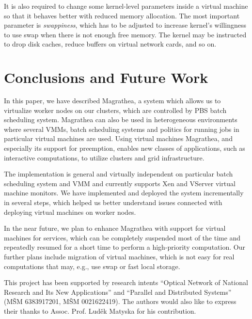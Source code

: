 \documentclass{sigplanconf}
\begin{document}
It is also required to change some kernel-level parameters inside a virtual
machine so that it behaves better with reduced memory allocation. The most
important parameter is \textit{swappiness}, which has to be adjusted to
increase kernel's willingness to use swap when there is not enough free
memory. The kernel may be instructed to drop disk caches, reduce buffers on
virtual network cards, and so on.

\section{Conclusions and Future Work}

In this paper, we have described Magrathea, a system which allows us to
virtualize worker nodes on our clusters, which are controlled by PBS batch
scheduling system. Magrathea can also be used in heterogeneous environments
where several VMMs, batch scheduling systems and politics for running jobs in
particular virtual machines are used. Using virtual machines Magrathea, and
especially its support for preemption, enables new classes of applications,
such as interactive computations, to utilize clusters and grid infrastructure.

The implementation is general and virtually independent on particular batch
scheduling system and VMM and currently supports Xen and VServer virtual
machine monitors. We have implemented and deployed the system incrementally in
several steps, which helped us better understand issues connected with
deploying virtual machines on worker nodes.

In the near future, we plan to enhance Magrathea with support for virtual
machines for services, which can be completely suspended most of the time and
repeatedly resumed for a short time to perform a high-priority computation.
Our further plans include migration of virtual machines, which is not easy for
real computations that may, e.g., use swap or fast local storage.

\acks

This project has been supported by research intents ``Optical Network of
National Research and Its New Applications'' and ``Parallel and Distributed
Systems'' (M\v{S}M 6383917201, M\v{S}M 0021622419). The authors would also
like to express their thanks to Assoc. Prof. Lud\v{e}k Matyska for his
contribution.
\end{document}
